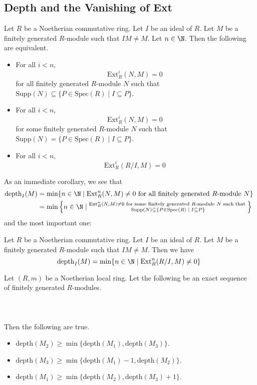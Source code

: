 \documentclass[a4paper]{article}
\begin{document}
\subsection{Depth and the Vanishing of Ext}
\begin{prp}{}{} Let $R$ be a Noetherian commutative ring. Let $I$ be an ideal of $R$. Let $M$ be a finitely generated $R$-module such that $IM\neq M$. Let $n\in\N$. Then the following are equivalent. 
\begin{itemize}
\item For all $i<n$, $$\text{Ext}_R^i(N,M)=0$$ for all finitely generated $R$-module $N$ such that $\text{Supp}(N)\subseteq\{P\in\text{Spec}(R)\;|\;I\subseteq P\}$. 
\item For all $i<n$, $$\text{Ext}_R^i(N,M)=0$$ for some finitely generated $R$-module $N$ such that $\text{Supp}(N)=\{P\in\text{Spec}(R)\;|\;I\subseteq P\}$. 
\item For all $i<n$, $$\text{Ext}_R^i\left(R/I,M\right)=0$$
\end{itemize}
\end{prp}

As an immediate corollary, we see that 
\begin{align*}
\text{depth}_I(M)&=\min\{n\in\N\;|\;\text{Ext}_R^n(N,M)\neq 0\text{ for all finitely generated }R\text{-module }N\}\\
&=\min\left\{n\in\N\;|\;\substack{\text{Ext}_R^n(N,M)\neq 0\text{ for some finitely generated }R\text{-module }N\text{ such that }\\\text{Supp}(N)\subseteq\{P\in\text{Spec}(R)\;|\;I\subseteq P\}}\right\}
\end{align*}
and the most important one: 

\begin{crl}{}{} Let $R$ be a Noetherian commutative ring. Let $I$ be an ideal of $R$. Let $M$ be a finitely generated $R$-module such that $IM\neq M$. Then we have $$\text{depth}_I(M)=\min\{n\in\N\;|\;\text{Ext}_R^n(R/I,M)\neq 0\}$$
\end{crl}

\begin{lmm}{}{} Let $(R,m)$ be a Noetherian local ring. Let the following be an exact sequence of finitely generated $R$-modules. \\~\\
\\~\\
Then the following are true. 
\begin{itemize}
\item $\text{depth}(M_2)\geq\min\{\text{depth}(M_1),\text{depth}(M_3)\}$. 
\item $\text{depth}(M_3)\geq\min\{\text{depth}(M_1)-1,\text{depth}(M_2)\}$. 
\item $\text{depth}(M_1)\geq\min\{\text{depth}(M_2),\text{depth}(M_3)+1\}$. 
\end{itemize}
\end{lmm}
\end{document}
